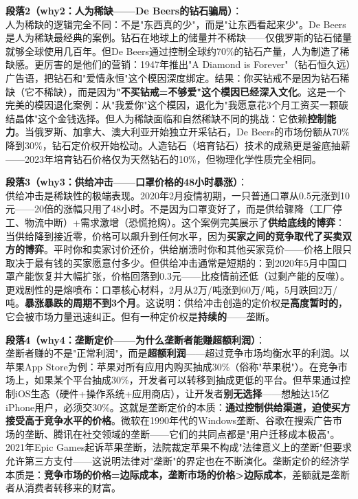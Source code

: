 \documentclass[../main.tex]{subfiles}
\begin{document}
	\textbf{段落2（why2：人为稀缺——De Beers的钻石骗局）}：\\
	人为稀缺的逻辑完全不同：不是"东西真的少"，而是"让东西看起来少"。De Beers是人为稀缺最经典的案例。钻石在地球上的储量并不稀缺——仅俄罗斯的钻石储量就够全球使用几百年。但De Beers通过控制全球约70\%的钻石产量，人为制造了稀缺感。更厉害的是他们的营销：1947年推出"A Diamond is Forever"（钻石恒久远）广告语，把钻石和"爱情永恒"这个模因深度绑定。结果：你买钻戒不是因为钻石稀缺（它不稀缺），而是因为\textbf{"不买钻戒=不够爱"这个模因已经深入文化}。这是一个完美的模因退化案例：从"我爱你"这个模因，退化为"我愿意花3个月工资买一颗碳结晶体"这个金钱选择。但人为稀缺面临和自然稀缺不同的挑战：它依赖\textbf{控制能力}。当俄罗斯、加拿大、澳大利亚开始独立开采钻石，De Beers的市场份额从70\%降到30\%，钻石定价权开始松动。人造钻石（培育钻石）技术的成熟更是釜底抽薪——2023年培育钻石价格仅为天然钻石的10\%，但物理化学性质完全相同。

	\textbf{段落3（why3：供给冲击——口罩价格的48小时暴涨）}：\\
	供给冲击是稀缺性的极端表现。2020年2月疫情初期，一只普通口罩从0.5元涨到10元——20倍的涨幅只用了48小时。不是因为口罩变好了，而是供给骤降（工厂停工、物流中断）+需求激增（恐慌抢购）。这个案例完美展示了\textbf{供给底线的博弈}：当供给降到接近零，价格可以飙升到任何水平，因为\textbf{买家之间的竞争取代了买卖双方的博弈}。平时你和卖家讨价还价，供给崩溃时你和其他买家竞价——价格上限只取决于最有钱的买家愿意付多少。但供给冲击通常是短期的：到2020年5月中国口罩产能恢复并大幅扩张，价格回落到0.3元——比疫情前还低（过剩产能的反噬）。更戏剧性的是熔喷布：口罩核心材料，2月从2万/吨涨到60万/吨，5月跌回2万/吨。\textbf{暴涨暴跌的周期不到3个月}。这说明：供给冲击创造的定价权是\textbf{高度暂时的}，它会被市场力量迅速纠正。但有一种定价权是\textbf{持续的}——垄断。

	\textbf{段落4（why4：垄断定价——为什么垄断者能赚超额利润）}：\\
	垄断者赚的不是"正常利润"，而是\textbf{超额利润}——超过竞争市场均衡水平的利润。以苹果App Store为例：苹果对所有应用内购买抽成30\%（俗称"苹果税"）。在竞争市场上，如果某个平台抽成30\%，开发者可以转移到抽成更低的平台。但苹果通过控制iOS生态（硬件+操作系统+应用商店），让开发者\textbf{别无选择}——想触达15亿iPhone用户，必须交30\%。这就是垄断定价的本质：\textbf{通过控制供给渠道，迫使买方接受高于竞争水平的价格}。微软在1990年代的Windows垄断、谷歌在搜索广告市场的垄断、腾讯在社交领域的垄断——它们的共同点都是"用户迁移成本极高"。2021年Epic Games起诉苹果垄断，法院裁定苹果不构成"法律意义上的垄断"但要求允许第三方支付——这说明法律对"垄断"的界定也在不断演化。垄断定价的经济学本质是：\textbf{竞争市场的价格=边际成本，垄断市场的价格>边际成本}，差额就是垄断者从消费者转移来的财富。
\end{document}
